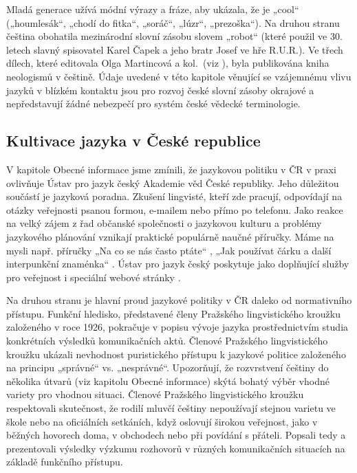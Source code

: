 \begin{multicols}{2}
Mladá generace užívá módní výrazy a fráze, aby ukázala, že je „cool“ („houmlesák“, „chodí do fitka“, „soráč“, „lúzr“, „prezoška“).
%
Na druhou stranu čeština obohatila mezinárodní slovní zásobu slovem „robot“ (které použil ve 30. letech slavný spisovatel Karel Čapek a jeho bratr Josef ve hře R.U.R.).
%
Ve třech dílech, které editovala Olga Martincová a kol.~(viz \cite{Martincova}), byla publikována kniha neologismů v češtině.
%
Údaje uvedené v této kapitole věnující se vzájemnému vlivu jazyků v blízkém kontaktu jsou pro rozvoj české slovní zásoby okrajové a nepředstavují žádné nebezpečí pro systém české vědecké terminologie.
  
\subsection{Kultivace jazyka v České republice}

V kapitole Obecné informace jsme zmínili, že jazykovou politiku v ČR v praxi ovlivňuje Ústav pro jazyk český Akademie věd České republiky. Jeho důležitou součástí je jazyková poradna. Zkušení lingvisté, kteří zde pracují, odpovídají na otázky veřejnosti psanou formou, e-mailem nebo přímo po telefonu. Jako reakce na velký zájem z řad občanské společnosti o jazykovou kulturu a problémy jazykového plánování vznikají praktické populárně naučné příručky. Máme na mysli např. příručky „Na co se nás často ptáte“ \cite{Cerna}, „Jak používat čárku a další interpunkční znaménka“ \cite{Janovec}. Ústav pro jazyk český poskytuje jako doplňující služby pro veřejnost i speciální webové stránky \cite{Note6}.

Na druhou stranu je hlavní proud jazykové politiky v ČR daleko od normativního přístupu. Funkční hledisko, představené členy Pražského lingvistického kroužku založeného v roce 1926, pokračuje v popisu vývoje jazyka prostřednictvím studia konkrétních výsledků komunikačních aktů. Členové Pražského lingvistického kroužku ukázali nevhodnost puristického přístupu k jazykové politice založeného na principu „správné“ vs. „nesprávné“. Upozorňují, že rozvrstvení češtiny do několika útvarů (viz kapitolu Obecné informace) skýtá bohatý výběr vhodné variety pro vhodnou situaci. Členové Pražského lingvistického kroužku respektovali skutečnost, že rodilí mluvčí češtiny nepoužívají stejnou varietu ve škole nebo na oficiálních setkáních, když oslovují širokou veřejnost, jako v běžných hovorech doma, v obchodech nebo při povídání s přáteli. Popsali tedy a prezentovali výsledky výzkumu rozhovorů v různých komunikačních situacích na základě funkčního přístupu.


\end{multicols}

